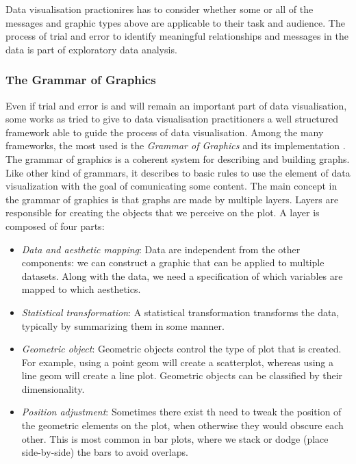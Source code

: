 \documentclass[]{book}
\providecommand{\tightlist}{%
  \setlength{\itemsep}{0pt}\setlength{\parskip}{0pt}}
\begin{document}
Data visualisation practionires has to consider whether some or all of
the messages and graphic types above are applicable to their task and
audience. The process of trial and error to identify meaningful
relationships and messages in the data is part of exploratory data
analysis.

\subsubsection{The Grammar of Graphics}\label{the-grammar-of-graphics}

Even if trial and error is and will remain an important part of data
visualisation, some works as tried to give to data visualisation
practitioners a well structured framework able to guide the process of
data visualisation. Among the many frameworks, the most used is the
\emph{Grammar of Graphics} \citep{wilkinson2006grammar} and its
implementation \citep{wickham2008ggplot2}. The grammar of graphics is a
coherent system for describing and building graphs. Like other kind of
grammars, it describes to basic rules to use the element of data
visualization with the goal of comunicating some content. The main
concept in the grammar of graphics is that graphs are made by multiple
layers. Layers are responsible for creating the objects that we perceive
on the plot. A layer is composed of four parts:

\begin{itemize}
\tightlist
\item
  \emph{Data and aesthetic mapping}: Data are independent from the other
  components: we can construct a graphic that can be applied to multiple
  datasets. Along with the data, we need a specification of which
  variables are mapped to which aesthetics.
\item
  \emph{Statistical transformation}: A statistical transformation
  transforms the data, typically by summarizing them in some manner.
\item
  \emph{Geometric object}: Geometric objects control the type of plot
  that is created. For example, using a point geom will create a
  scatterplot, whereas using a line geom will create a line plot.
  Geometric objects can be classified by their dimensionality.
\item
  \emph{Position adjustment}: Sometimes there exist th need to tweak the
  position of the geometric elements on the plot, when otherwise they
  would obscure each other. This is most common in bar plots, where we
  stack or dodge (place side-by-side) the bars to avoid overlaps.
\end{itemize}
\end{document}
